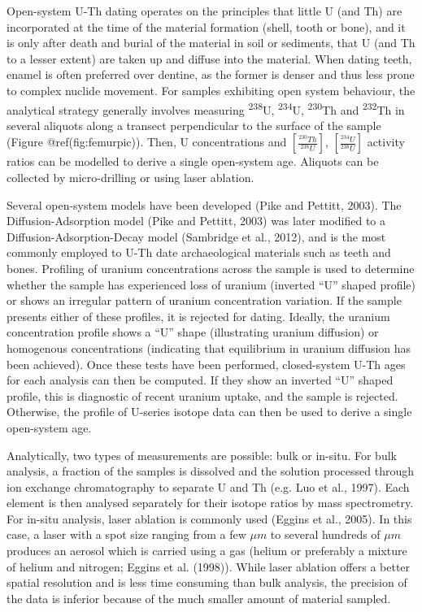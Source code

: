 \documentclass[]{elsarticle} %
\begin{document}
Open-system U-Th dating operates on the principles that little U (and Th) are incorporated at the time of the material formation (shell, tooth or bone), and it is only after death and burial of the material in soil or sediments, that U (and Th to a lesser extent) are taken up and diffuse into the material. When dating teeth, enamel is often preferred over dentine, as the former is denser and thus less prone to complex nuclide movement.
For samples exhibiting open system behaviour, the analytical strategy generally involves measuring \textsuperscript{238}U, \textsuperscript{234}U, \textsuperscript{230}Th and \textsuperscript{232}Th in several aliquots along a transect perpendicular to the surface of the sample (Figure @ref(fig:femurpic)). Then, U concentrations and \([\frac{^{230}Th}{^{238}U}]\), \([\frac{^{234}U}{^{238}U}]\) activity ratios can be modelled to derive a single open-system age. Aliquots can be collected by micro-drilling or using laser ablation.

Several open-system models have been developed (Pike and Pettitt, 2003). The Diffusion-Adsorption model (Pike and Pettitt, 2003) was later modified to a Diffusion-Adsorption-Decay model (Sambridge et al., 2012), and is the most commonly employed to U-Th date archaeological materials such as teeth and bones. Profiling of uranium concentrations across the sample is used to determine whether the sample has experienced loss of uranium (inverted ``U'' shaped profile) or shows an irregular pattern of uranium concentration variation. If the sample presents either of these profiles, it is rejected for dating. Ideally, the uranium concentration profile shows a ``U'' shape (illustrating uranium diffusion) or homogenous concentrations (indicating that equilibrium in uranium diffusion has been achieved). Once these tests have been performed, closed-system U-Th ages for each analysis can then be computed. If they show an inverted ``U'' shaped profile, this is diagnostic of recent uranium uptake, and the sample is rejected. Otherwise, the profile of U-series isotope data can then be used to derive a single open-system age.

Analytically, two types of measurements are possible: bulk or in-situ. For bulk analysis, a fraction of the samples is dissolved and the solution processed through ion exchange chromatography to separate U and Th (e.g. Luo et al., 1997). Each element is then analysed separately for their isotope ratios by mass spectrometry.
For in-situ analysis, laser ablation is commonly used (Eggins et al., 2005). In this case, a laser with a spot size ranging from a few \(\mu m\) to several hundreds of \(\mu m\) produces an aerosol which is carried using a gas (helium or preferably a mixture of helium and nitrogen; Eggins et al. (1998)).
While laser ablation offers a better spatial resolution and is less time consuming than bulk analysis, the precision of the data is inferior because of the much smaller amount of material sampled.
\end{document}
